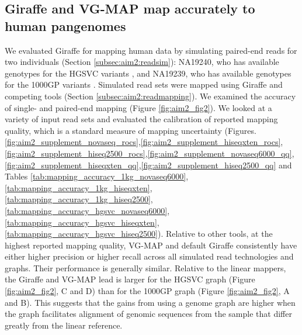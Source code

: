 \documentclass[11pt]{ucscthesis}
\begin{document}
\subsection{Giraffe and VG-MAP map accurately to human pangenomes}
We evaluated Giraffe for mapping human data by simulating paired-end reads for two individuals (Section \ref{subsec:aim2:readsim}): NA19240, who has available genotypes for the HGSVC variants \cite{chaisson_sv_2019}, and NA19239, who has available genotypes for the 1000GP variants \cite{1000gp_2015}.
Simulated read sets were mapped using Giraffe and competing tools (Section \ref{subsec:aim2:readmapping}).
We examined the accuracy of single- and paired-end mapping (Figure \ref{fig:aim2_fig2}).
We looked at a variety of input read sets and evaluated the calibration of reported mapping quality, which is a standard measure of mapping uncertainty (Figures.\ref{fig:aim2_supplement_novaseq_rocs},\ref{fig:aim2_supplement_hiseqxten_rocs},\ref{fig:aim2_supplement_hiseq2500_rocs},\ref{fig:aim2_supplement_novaseq6000_qq},\ref{fig:aim2_supplement_hiseqxten_qq},\ref{fig:aim2_supplement_hiseq2500_qq} and Tables \ref{tab:mapping_accuracy_1kg_novaseq6000},\ref{tab:mapping_accuracy_1kg_hiseqxten},\ref{tab:mapping_accuracy_1kg_hiseq2500},\ref{tab:mapping_accuracy_hgsvc_novaseq6000},\ref{tab:mapping_accuracy_hgsvc_hiseqxten},\ref{tab:mapping_accuracy_hgsvc_hiseq2500}).
Relative to other tools, at the highest reported mapping quality, VG-MAP and default Giraffe consistently have either higher precision or higher recall across all simulated read technologies and graphs.
Their performance is generally similar.
Relative to the linear mappers, the Giraffe and VG-MAP lead is larger for the HGSVC graph (Figure \ref{fig:aim2_fig2}, C and D) than for the 1000GP graph (Figure \ref{fig:aim2_fig2}, A and B).
This suggests that the gains from using a genome graph are higher when the graph facilitates alignment of genomic sequences from the sample that differ greatly from the linear reference.
\end{document}
